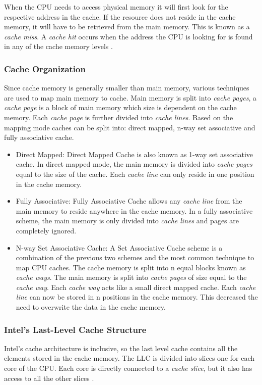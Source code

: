 \documentclass[10pt,a4paper,twoside]{book}
\begin{document}
When the CPU needs to access physical memory it will first look for the respective address in the cache. If the resource does not reside in the cache memory, it will have to be retrieved from the main memory. This is known as a \textit{cache miss}. A \textit{cache hit} occurs when the address the CPU is looking for is found in any of the cache memory levels \cite{oren2015spy}.

\subsubsection{Cache Organization}
Since cache memory is generally smaller than main memory, various techniques are used to map main memory to cache. Main memory is split into \textit{cache pages}, a \textit{cache page} is a block of main memory which size is dependent on the cache memory. Each \textit{cache page} is further divided into \textit{cache lines}. Based on the mapping mode caches can be split into: direct mapped, n-way set associative and fully associative cache.
\begin{itemize}
\item Direct Mapped: Direct Mapped Cache is also known as 1-way set associative cache. In direct mapped mode, the main memory is divided into \textit{cache pages} equal to the size of the cache. Each \textit{cache line} can only reside in one position in the cache memory. 
\item Fully Associative: Fully Associative Cache allows any \textit{cache line} from the main memory to reside anywhere in the cache memory. In a fully associative scheme, the main memory is only divided into \textit{cache lines} and pages are completely ignored.
\item N-way Set Associative Cache: A Set Associative Cache scheme is a combination of the previous two schemes and the most common technique to map CPU caches. The cache memory is split into n equal blocks known as \textit{cache ways}. The main memory is split into \textit{cache pages} of size equal to the \textit{cache way}. Each \textit{cache way} acts like a small direct mapped cache. Each \textit{cache line} can now be stored in n positions in the cache memory. This decreased the need to overwrite the data in the cache memory.
\end{itemize}

\subsubsection{Intel's Last-Level Cache Structure}
Intel's cache architecture is inclusive, so the last level cache contains all the elements stored in the cache memory. The LLC is divided into slices one for each core of the CPU. Each core is directly connected to a \textit{cache slice}, but it also has access to all the other slices \cite{oren2015spy}.
\end{document}
